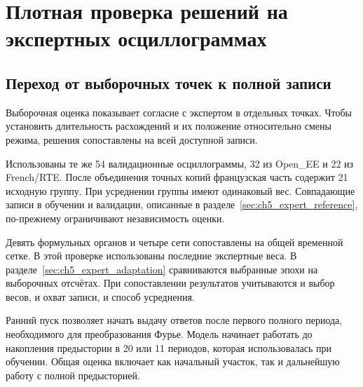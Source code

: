\section{Плотная проверка решений на экспертных осциллограммах}
\label{sec:ch5_dense_validation}

\subsection{Переход от выборочных точек к полной записи}

Выборочная оценка показывает согласие с экспертом в отдельных точках. Чтобы установить
длительность расхождений и их положение относительно смены режима, решения сопоставлены
на всей доступной записи.

Использованы те же 54 валидационные осциллограммы, 32 из Open\_EE и 22 из French/RTE.
После объединения точных копий французская часть содержит 21 исходную группу. При
усреднении группы имеют одинаковый вес. Совпадающие записи в обучении и валидации,
описанные в разделе~\ref{sec:ch5_expert_reference}, по-прежнему ограничивают
независимость оценки.

Девять формульных органов и четыре сети сопоставлены на общей временной сетке. В этой
проверке использованы последние экспертные веса. В
разделе~\ref{sec:ch5_expert_adaptation} сравниваются выбранные эпохи на выборочных
отсчётах. При сопоставлении результатов учитываются и выбор весов, и охват записи, и
способ усреднения.

Ранний пуск позволяет начать выдачу ответов после первого полного периода, необходимого
для преобразования Фурье. Модель начинает работать до накопления предыстории в 20 или 11
периодов, которая использовалась при обучении. Общая оценка включает как начальный
участок, так и дальнейшую работу с полной предысторией.


